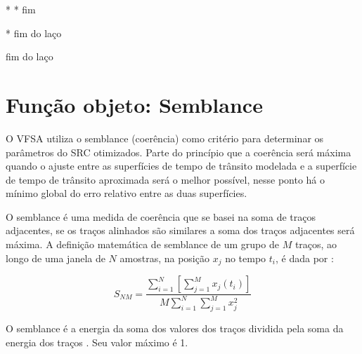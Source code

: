 * * fim 

* fim do laço

fim do laço


\section{Função objeto: Semblance}
\label{sec:2.2}

O VFSA utiliza o semblance (coerência) como critério para determinar os parâmetros do SRC otimizados. Parte do princípio que
a coerência será máxima quando o ajuste entre as superfícies de tempo de trânsito modelada e a superfície de tempo de trânsito
aproximada será o melhor possível, nesse ponto há o mínimo global do erro relativo entre as duas superfícies.

O semblance é uma medida de coerência que se basei na soma de traços adjacentes, se os traços alinhados são similares
a soma dos traços adjacentes será máxima. A definição matemática de semblance de um grupo de $M$ traços, ao 
longo de uma janela de $N$ amostras, na posição $x_j$ no tempo $t_i$, é dada por \cite{seg}:

\begin{equation}
\label{eq:2.17}
 S_{NM}=\frac{ \sum_{i=1}^N [\sum_{j=1}^M x_j(t_i)]}{M \sum_{i=1}^N \sum_{j=1}^Mx^2_{j}}
\end{equation}

O semblance é a energia da soma dos valores dos traços dividida pela soma da energia dos traços \cite{seg}. 
Seu valor máximo é 1.
